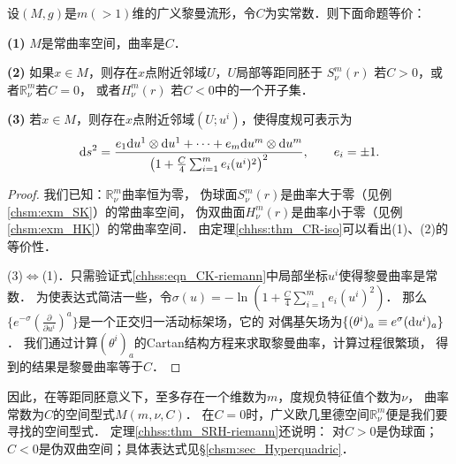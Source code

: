 \begin{theorem}\label{chhss:thm_SRH-riemann}
    设$(M,g)$是$m(>1)$维的广义黎曼流形，令$C$为实常数．则下面命题等价：
    
    {\bfseries (1)} $M$是常曲率空间，曲率是$C$．
    
    {\bfseries (2)} 如果$x\in M$，则存在$x$点附近邻域$U$，$U$局部等距同胚于
    $S^m_\nu(r)$ 若$C>0$，或者$\mathbb{R}^m_\nu$若$C=0$，
    或者$H^m_\nu(r)$ 若$C<0$中的一个开子集．
    
    {\bfseries (3)} 若$x\in M$，则存在$x$点附近邻域$(U;u^i)$，使得度规可表示为
    \begin{equation}\label{chhss:eqn_CK-riemann}
        {\rm d}s^2=\frac{e_1 {\rm d}u^1 \otimes {\rm d}u^1 + \cdots +e_m {\rm d}u^m \otimes {\rm d}u^m}
        {\left(1+\tfrac{C}{4} \sum_{i=1}^{m} e_i (u^i)^2\right)^2},\qquad e_i=\pm 1.
    \end{equation}
\end{theorem}
\begin{proof}
    我们已知：$\mathbb{R}^m_\nu$曲率恒为零，
    伪球面$S^m_\nu(r)$是曲率大于零（见例\ref{chsm:exm_SK}）的常曲率空间，
    伪双曲面$H^m_\nu(r)$是曲率小于零（见例\ref{chsm:exm_HK}）的常曲率空间．
    由定理\ref{chhss:thm_CR-iso}可以看出(1)、(2)的等价性．
    
    (3)$\Leftrightarrow $(1)．只需验证式\eqref{chhss:eqn_CK-riemann}中局部坐标$u^i$使得黎曼曲率是常数．
    为使表达式简洁一些，令$\sigma(u) =-\ln \left(1+\tfrac{C}{4} \sum_{i=1}^{m} e_i (u^i)^2\right) $．
    那么$\{e^{-\sigma} (\frac{\partial}{\partial u^i})^a \}$是一个正交归一活动标架场，它的
    对偶基矢场为$\{(\theta^i)_a\equiv e^{\sigma} ({\rm d}u^i)_a \}$．
    我们通过计算$(\theta^i)_a$的Cartan结构方程来求取黎曼曲率，计算过程很繁琐，
    得到的结果是黎曼曲率等于$C$．
\end{proof}


因此，在等距同胚意义下，至多存在一个维数为$m$，度规负特征值个数为$\nu$，
曲率常数为$C$的空间型式$M(m, \nu, C)$．
在$C = 0$时，广义欧几里德空间$\mathbb{R}^m_\nu$便是我们要寻找的空间型式．
定理\ref{chhss:thm_SRH-riemann}还说明：
对$C>0$是伪球面；$C<0$是伪双曲空间；具体表达式见\S\ref{chsm:sec_Hyperquadric}．


